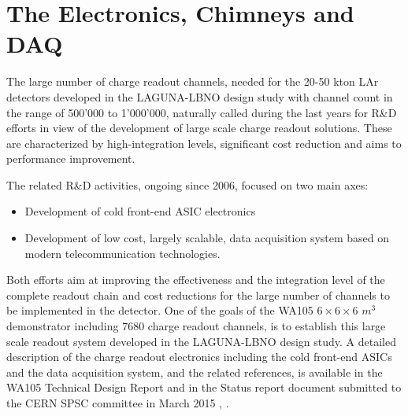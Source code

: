 \section{The Electronics, Chimneys and DAQ}
\label{sec:detectors-fd-alt-elec}

The large number of charge readout channels, needed for the 20-50 kton LAr detectors developed in the LAGUNA-LBNO design study with channel count in the range of 500'000 to 1'000'000, naturally called during the last years for R\&D efforts in view of the development of large scale charge readout solutions. These are characterized by high-integration levels, significant cost reduction and aims to performance improvement. 

The related R\&D activities, ongoing since 2006, focused on two main axes:
\begin {itemize} 
\item{Development of cold front-end ASIC electronics}
\item{Development of low cost, largely scalable, data acquisition system based on modern telecommunication technologies.}
\end{itemize}

Both efforts aim at improving the effectiveness and the integration level of the complete readout chain and cost reductions for the large number of channels to be implemented in the detector. One of the goals of the WA105  $6 \times 6 \times  6$ $m^3$ demonstrator including 7680 charge readout channels, is to establish this large scale readout system developed in the LAGUNA-LBNO design study. A detailed description of the charge readout electronics including the cold front-end ASICs and the data acquisition system, and the related references, is available in the WA105 Technical Design Report and in the Status report document submitted to the CERN SPSC committee in March 2015 \cite{WA105_TDR}, \cite{WA105_SREP}.

